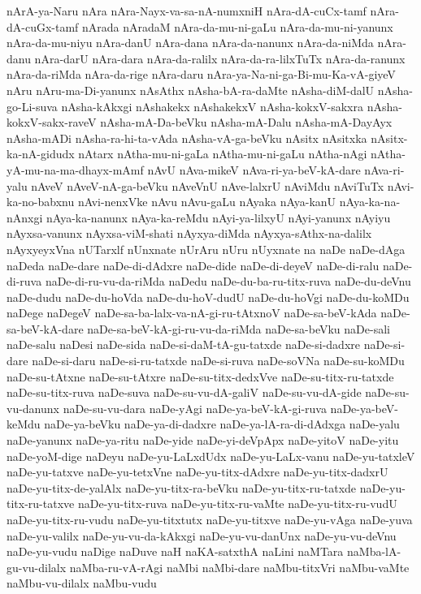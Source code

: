 {nArA-ya-Naru
nAra
nAra-Nayx-va-sa-nA-numxniH
nAra-dA-cuCx-tamf
nAra-dA-cuGx-tamf
nArada
nAradaM
nAra-da-mu-ni-gaLu
nAra-da-mu-ni-yanunx
nAra-da-mu-niyu
nAra-danU
nAra-dana
nAra-da-nanunx
nAra-da-niMda
nAra-danu
nAra-darU
nAra-dara
nAra-da-ralilx
nAra-da-ra-lilxTuTx
nAra-da-ranunx
nAra-da-riMda
nAra-da-rige
nAra-daru
nAra-ya-Na-ni-ga-Bi-mu-Ka-vA-giyeV
nAru
nAru-ma-Di-yanunx
nAsAthx
nAsha-bA-ra-daMte
nAsha-diM-dalU
nAsha-go-Li-suva
nAsha-kAkxgi
nAshakekx
nAshakekxV
nAsha-kokxV-sakxra
nAsha-kokxV-sakx-raveV
nAsha-mA-Da-beVku
nAsha-mA-Dalu
nAsha-mA-DayAyx
nAsha-mADi
nAsha-ra-hi-ta-vAda
nAsha-vA-ga-beVku
nAsitx
nAsitxka
nAsitx-ka-nA-gidudx
nAtarx
nAtha-mu-ni-gaLa
nAtha-mu-ni-gaLu
nAtha-nAgi
nAtha-yA-mu-na-ma-dhayx-mAmf
nAvU
nAva-mikeV
nAva-ri-ya-beV-kA-dare
nAva-ri-yalu
nAveV
nAveV-nA-ga-beVku
nAveVnU
nAve-lalxrU
nAviMdu
nAviTuTx
nAvi-ka-no-babxnu
nAvi-nenxVke
nAvu
nAvu-gaLu
nAyaka
nAya-kanU
nAya-ka-na-nAnxgi
nAya-ka-nanunx
nAya-ka-reMdu
nAyi-ya-lilxyU
nAyi-yanunx
nAyiyu
nAyxsa-vanunx
nAyxsa-viM-shati
nAyxya-diMda
nAyxya-sAthx-na-dalilx
nAyxyeyxVna
nUTarxlf
nUnxnate
nUrAru
nUru
nUyxnate
na
naDe
naDe-dAga
naDeda
naDe-dare
naDe-di-dAdxre
naDe-dide
naDe-di-deyeV
naDe-di-ralu
naDe-di-ruva
naDe-di-ru-vu-da-riMda
naDedu
naDe-du-ba-ru-titx-ruva
naDe-du-deVnu
naDe-dudu
naDe-du-hoVda
naDe-du-hoV-dudU
naDe-du-hoVgi
naDe-du-koMDu
naDege
naDegeV
naDe-sa-ba-lalx-va-nA-gi-ru-tAtxnoV
naDe-sa-beV-kAda
naDe-sa-beV-kA-dare
naDe-sa-beV-kA-gi-ru-vu-da-riMda
naDe-sa-beVku
naDe-sali
naDe-salu
naDesi
naDe-sida
naDe-si-daM-tA-gu-tatxde
naDe-si-dadxre
naDe-si-dare
naDe-si-daru
naDe-si-ru-tatxde
naDe-si-ruva
naDe-soVNa
naDe-su-koMDu
naDe-su-tAtxne
naDe-su-tAtxre
naDe-su-titx-dedxVve
naDe-su-titx-ru-tatxde
naDe-su-titx-ruva
naDe-suva
naDe-su-vu-dA-galiV
naDe-su-vu-dA-gide
naDe-su-vu-danunx
naDe-su-vu-dara
naDe-yAgi
naDe-ya-beV-kA-gi-ruva
naDe-ya-beV-keMdu
naDe-ya-beVku
naDe-ya-di-dadxre
naDe-ya-lA-ra-di-dAdxga
naDe-yalu
naDe-yanunx
naDe-ya-ritu
naDe-yide
naDe-yi-deVpApx
naDe-yitoV
naDe-yitu
naDe-yoM-dige
naDeyu
naDe-yu-LaLxdUdx
naDe-yu-LaLx-vanu
naDe-yu-tatxleV
naDe-yu-tatxve
naDe-yu-tetxVne
naDe-yu-titx-dAdxre
naDe-yu-titx-dadxrU
naDe-yu-titx-de-yalAlx
naDe-yu-titx-ra-beVku
naDe-yu-titx-ru-tatxde
naDe-yu-titx-ru-tatxve
naDe-yu-titx-ruva
naDe-yu-titx-ru-vaMte
naDe-yu-titx-ru-vudU
naDe-yu-titx-ru-vudu
naDe-yu-titxtutx
naDe-yu-titxve
naDe-yu-vAga
naDe-yuva
naDe-yu-valilx
naDe-yu-vu-da-kAkxgi
naDe-yu-vu-danUnx
naDe-yu-vu-deVnu
naDe-yu-vudu
naDige
naDuve
naH
naKA-satxthA
naLini
naMTara
naMba-lA-gu-vu-dilalx
naMba-ru-vA-rAgi
naMbi
naMbi-dare
naMbu-titxVri
naMbu-vaMte
naMbu-vu-dilalx
naMbu-vudu
}
